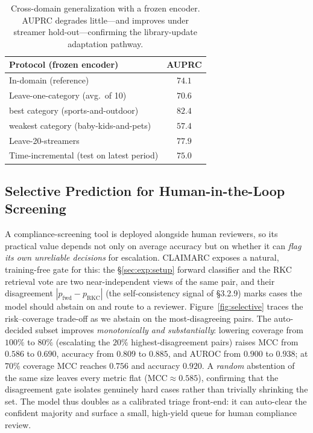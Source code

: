 \begin{table}[t]
\centering\small
\setlength{\tabcolsep}{6pt}
\begin{tabular}{lc}
\toprule
\textbf{Protocol (frozen encoder)} & \textbf{AUPRC} \\
\midrule
In-domain (reference) & $74.1$ \\
\midrule
Leave-one-category (avg.\ of 10) & $70.6$ \\
\quad best category (sports-and-outdoor) & $82.4$ \\
\quad weakest category (baby-kids-and-pets) & $57.4$ \\
Leave-20-streamers & $77.9$ \\
Time-incremental (test on latest period) & $75.0$ \\
\bottomrule
\end{tabular}
\caption{Cross-domain generalization with a frozen encoder. AUPRC degrades
little---and improves under streamer hold-out---confirming the
library-update adaptation pathway.}
\label{tab:xdom}
\end{table}

\subsection{Selective Prediction for Human-in-the-Loop Screening}
\label{sec:exp:select}

A compliance-screening tool is deployed alongside human reviewers, so its
practical value depends not only on average accuracy but on whether it can
\emph{flag its own unreliable decisions} for escalation. CLAIMARC exposes a
natural, training-free gate for this: the \S\ref{sec:exp:setup} forward
classifier and the RKC retrieval vote are two near-independent views of the same
pair, and their disagreement $|p_{\mathrm{fwd}}-p_{\mathrm{RKC}}|$ (the
self-consistency signal of \S3.2.9) marks cases the model should abstain on and
route to a reviewer. Figure~\ref{fig:selective} traces the risk--coverage
trade-off as we abstain on the most-disagreeing pairs. The auto-decided subset
improves \emph{monotonically and substantially}: lowering coverage from $100\%$
to $80\%$ (escalating the $20\%$ highest-disagreement pairs) raises MCC from
$0.586$ to $0.690$, accuracy from $0.809$ to $0.885$, and AUROC from $0.900$ to
$0.938$; at $70\%$ coverage MCC reaches $0.756$ and accuracy $0.920$. A
\emph{random} abstention of the same size leaves every metric flat
($\text{MCC}{\approx}0.585$), confirming that the disagreement gate isolates
genuinely hard cases rather than trivially shrinking the set. The model thus
doubles as a calibrated triage front-end: it can auto-clear the confident
majority and surface a small, high-yield queue for human compliance review.

